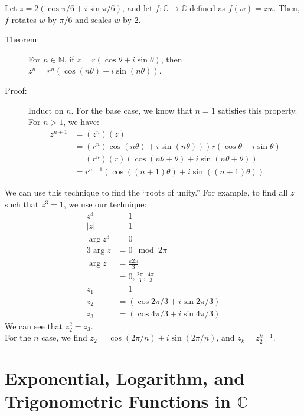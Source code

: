 \documentclass[10pt]{extarticle}
\newcommand{\N}{\mathbb{N}}
\newcommand{\C}{\mathbb{C}}
\begin{document}
  Let $z = 2(\cos \pi/6 + i\sin\pi/6)$, and let $f: \C \rightarrow \C$ defined as $f(w) = zw$. Then, $f$ rotates $w$ by $\pi/6$ and scales $w$ by $2$.\\

  \begin{description}
    \item[Theorem:] For $n\in \N$, if $z = r(\cos\theta + i\sin\theta)$, then $z^n = r^n(\cos(n\theta) + i\sin(n\theta))$.
    \item[Proof:] Induct on $n$. For the base case, we know that $n=1$ satisfies this property. For $n > 1$, we have:
      \begin{align*}
        z^{n+1} &= (z^n)(z)\\
                &= \left(r^n(\cos(n\theta) + i\sin(n\theta))\right)r(\cos\theta + i\sin\theta)\\
                &= (r^n)(r)\left(\cos(n\theta + \theta) + i\sin(n\theta + \theta)\right) \tag*{Polar Representation Definition}\\
                &= r^{n+1}(\cos\left((n+1)\theta\right) + i\sin((n+1)\theta))
      \end{align*}
  \end{description}
  We can use this technique to find the ``roots of unity.'' For example, to find all $z$ such that $z^3 = 1$, we use our technique:
  \begin{align*}
    z^3 &= 1\\
    |z| &= 1\\
    \arg z^3 &= 0\\
    3\arg z &= 0 \mod 2\pi\\
    \arg z &= \frac{k2\pi}{3}\\
           &= 0,\frac{2\pi}{3},\frac{4\pi}{3}\\
    z_1 &= 1\\
    z_2 &= (\cos 2\pi/3 + i\sin 2\pi/3)\\
    z_3 &= (\cos 4\pi/3 + i\sin 4\pi/3)
  \end{align*}
  We can see that $z_2^2 = z_3$.\\

  For the $n$ case, we find $z_2 = \cos(2\pi/n) + i\sin(2\pi/n)$, and $z_{k} = z_2^{k-1}$.
  \section{Exponential, Logarithm, and Trigonometric Functions in $\C$}%
\end{document}
